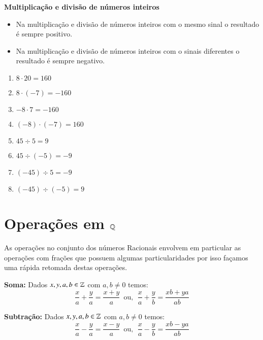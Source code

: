  \textbf{Multiplicação e divisão de números inteiros}

  \begin{itemize}
   \item Na multiplicação e divisão de números inteiros com o mesmo sinal o resultado é sempre positivo.
   \item Na multiplicação e divisão de números inteiros com o sinais diferentes o resultado é sempre negativo.
  \end{itemize}

  \begin{multicols}{2}
  \begin{enumerate}[1)]
   \item $8 \cdot 20= 160$
   \item $8 \cdot (-7)= -160$
   \item $-8 \cdot 7= -160$
   \item $(-8) \cdot (-7)= 160$
   \item $45 \div 5= 9$
   \item $45 \div (-5)= -9$
   \item $(-45) \div 5= -9$
   \item $(-45) \div (-5)= 9$
  \end{enumerate}
  \end{multicols}



 \section{Operações em \texorpdfstring{$\mathbb{Q}$}{Q}}

 As operações no conjunto dos números Racionais envolvem em particular as operações com frações que possuem algumas particularidades por isso façamos uma rápida retomada destas operações.

 \vskip0.3cm

 \colorbox{azul}{
 \begin{minipage}{0.9\linewidth}
 \begin{center}
  \textbf{Soma:} Dados $x, y, a, b \in \mathbb{Z}$ com $a, b \neq 0$ temos:
 \[\frac{x}{a} + \frac{y}{a}= \frac{x+y}{a} \, \text{ ou}, \ \
  \frac{x}{a} + \frac{y}{b}= \frac{xb + ya}{ab} \]
 \end{center}
 \end{minipage}}

 \vskip0.3cm

 \colorbox{azul}{
 \begin{minipage}{0.9\linewidth}
 \begin{center}
  \textbf{Subtração:} Dados $x, y, a, b \in \mathbb{Z}$ com $a, b \neq 0$ temos:
 \[\frac{x}{a} - \frac{y}{a}= \frac{x-y}{a} \, \text{ ou}, \ \
 \frac{x}{a} - \frac{y}{b}= \frac{xb - ya}{ab} \]
 \end{center}
 \end{minipage}}

